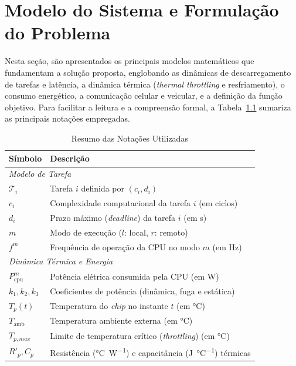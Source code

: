 \chapter{Modelo do Sistema e Formulação do Problema}
\label{chap:modelo-do-sistema-e-formulacao-do-problema}

Nesta seção, são apresentados os principais modelos matemáticos que fundamentam a solução proposta, englobando as dinâmicas de descarregamento de tarefas e latência, a dinâmica térmica (\textit{thermal throttling} e resfriamento), o consumo energético, a comunicação celular e veicular, e a definição da função objetivo. Para facilitar a leitura e a compreensão formal, a Tabela~\ref{tab:notations} sumariza as principais notações empregadas.

\begin{table}[ht]
\centering
\caption{Resumo das Notações Utilizadas}
\label{tab:notations}
{\scriptsize
\begin{tabularx}{\columnwidth}{l X}
\toprule
\textbf{Símbolo} & \textbf{Descrição} \\
\midrule
\multicolumn{2}{l}{\textit{Modelo de Tarefa}} \\
$\mathcal{T}_i$ & Tarefa $i$ definida por $(c_i, d_i)$ \\
$c_i$ & Complexidade computacional da tarefa $i$ (em ciclos) \\
$d_i$ & Prazo máximo (\textit{deadline}) da tarefa $i$ (em \unit{\second}) \\
$m$ & Modo de execução ($l$: local, $r$: remoto) \\
$f^m$ & Frequência de operação da \gls{CPU} no modo $m$ (em \unit{\hertz}) \\
\midrule
\multicolumn{2}{l}{\textit{Dinâmica Térmica e Energia}} \\
$P_{\mathrm{cpu}}^m$ & Potência elétrica consumida pela \gls{CPU} (em \unit{\watt}) \\
$k_1, k_2, k_3$ & Coeficientes de potência (dinâmica, fuga e estática) \\
$T_p(t)$ & Temperatura do \textit{chip} no instante $t$ (em \unit{\celsius}) \\
$T_{\mathrm{amb}}$ & Temperatura ambiente externa (em \unit{\celsius}) \\
$T_{p,max}$ & Limite de temperatura crítico (\textit{throttling}) (em \unit{\celsius}) \\
$R'_p, C_p$ & Resistência (\unit{\celsius\per\watt}) e capacitância (\unit{\joule\per\celsius}) térmicas \\
\midrule

\end{tabularx}}
\end{table}
